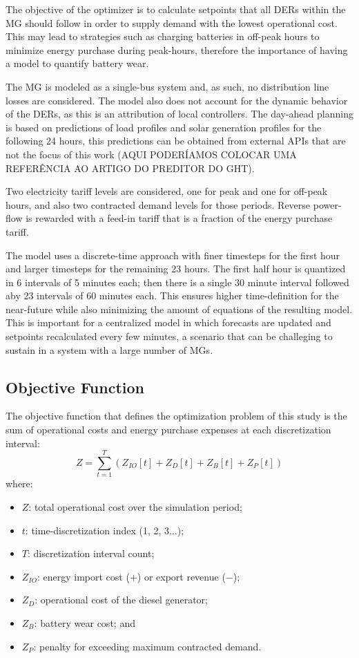 \documentclass{ieeeaccess}
\begin{document}
    The objective of the optimizer is to calculate setpoints that all DERs within the \ac{MG} should follow in order to supply demand with the lowest operational cost. This may lead to strategies such as charging batteries in off-peak hours to minimize energy purchase during peak-hours, therefore the importance of having a model to quantify battery wear.

    The \ac{MG} is modeled as a single-bus system and, as such, no distribution line losses are considered. The model also does not account for the dynamic behavior of the DERs, as this is an attribution of local controllers. The day-ahead planning is based on predictions of load profiles and solar generation profiles for the following 24 hours, this predictions can be obtained from external APIs that are not the focus of this work (AQUI PODERÍAMOS COLOCAR UMA REFERÊNCIA AO ARTIGO DO PREDITOR DO GHT).
    
    Two electricity tariff levels are considered, one for peak and one for off-peak hours, and also two contracted demand levels for those periods. Reverse power-flow is rewarded with a feed-in tariff that is a fraction of the energy purchase tariff.

    The model uses a discrete-time approach with finer timesteps for the first hour and larger timesteps for the remaining 23 hours. The first half hour is quantized in 6 intervals of 5 minutes each; then there is a single 30 minute interval followed 			aby 23 intervals of 60 minutes each. This ensures higher time-definition for the near-future while also minimizing the amount of equations of the resulting model. This is important for a centralized model in which forecasts are updated and setpoints recalculated every few minutes, a scenario that can be challeging to sustain in a system with a large number of \acp{MG}.

    \subsection{Objective Function}
    The objective function that defines the optimization problem of this study is the sum of operational costs and energy purchase expenses at each discretization interval:
    \begin{equation}
        Z = \sum_{t=1}^T(Z_{IO}[t] + Z_D[t] + Z_B[t] + Z_P[t])
        \label{eq:z1}
    \end{equation}
    where:
    \begin{itemize}
        \item $Z$: total operational cost over the simulation period;
        \item $t$: time-discretization index (1, 2, 3...);
        \item $T$: discretization interval count;
        \item $Z_{IO}$: energy import cost ($+$) or export revenue ($-$);
        \item $Z_{D}$: operational cost of the diesel generator;
        \item $Z_{B}$: battery wear cost; and
        \item $Z_{P}$: penalty for exceeding maximum contracted demand.
    \end{itemize}
\end{document}
